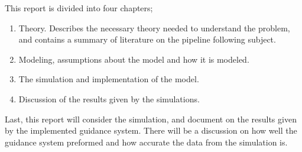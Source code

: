 	This report is divided into four chapters;
	\begin{enumerate}
	 \item Theory. Describes the necessary theory needed to understand the problem, and contains a summary
	of literature on the pipeline following subject.
	 \item Modeling, assumptions about the model and how it is modeled.
	 \item The simulation and implementation of the model.
	 \item Discussion of the results given by the simulations.
	\end{enumerate}

	Last, this report will consider the simulation, and document on the results given by the implemented 
	guidance system. There will be a discussion on how well the guidance system preformed and how accurate
	the data from the simulation is. 
	
	
	

